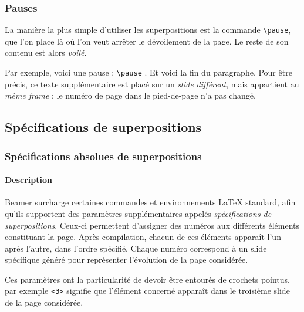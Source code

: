 \documentclass[10pt,    %
    french,             %
    xcolor=table,       %
    envcountsect        %
]{beamer}
\begin{document}
\begin{frame}
    \frametitle{Pauses}
    
    La manière la plus simple d'utiliser les superpositions est la commande \texttt{\textbackslash{}pause}, que l'on place là où l'on veut arrêter le dévoilement de la page. Le reste de son contenu est alors \textit{voilé}.
    
    \vspace{0.25cm}
    Par exemple, voici une pause : \texttt{\textbackslash{}pause} \pause. Et voici la fin du paragraphe. Pour être précis, ce texte supplémentaire est placé sur un \textit{slide différent}, mais appartient au \textit{même frame} : le numéro de page dans le pied-de-page n'a pas changé.
    
    \vspace{0.25cm}
\end{frame}

\subsection{Spécifications de superpositions}
\begin{frame}
    \frametitle{Spécifications absolues de superpositions}
    \framesubtitle{Description}
    
    Beamer surcharge certaines commandes et environnements \LaTeX{} standard, afin qu'ils supportent des paramètres supplémentaires appelés \textit{spécifications de superpositions}. Ceux-ci permettent d'assigner des numéros aux différents éléments constituant la page. Après compilation, chacun de ces éléments apparaît l'un après l'autre, dans l'ordre spécifié. Chaque numéro correspond à un slide spécifique généré pour représenter l'évolution de la page considérée.
    
    \vspace{0.25cm}
    Ces paramètres ont la particularité de devoir être entourés de crochets pointus, par exemple \texttt{<3>} signifie que l'élément concerné apparaît dans le troisième slide de la page considérée.   
\end{frame}
\end{document}

